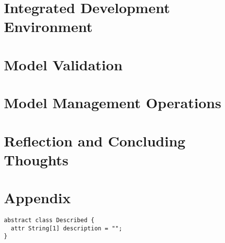\documentclass[11pt,fleqn]{article}
\begin{document}
\section{Integrated Development Environment}
\label{sec:integrated-development-environment}

\newpage{}

\section{Model Validation}
\label{sec:model-validation}

\newpage{}

\section{Model Management Operations}
\label{sec:model-management-operations}

\newpage{}

\section{Reflection and Concluding Thoughts}
\label{sec:reflection-and-concluding-thoughts}

\newpage{}

\printbibliography[heading=bibintoc]

\newpage{}

\section*{Appendix}
\label{sec:appendix}

\begin{lstlisting}[caption={Abstract Class: Described},label={lst:described}]
abstract class Described {
  attr String[1] description = "";
}
\end{lstlisting}
\end{document}
